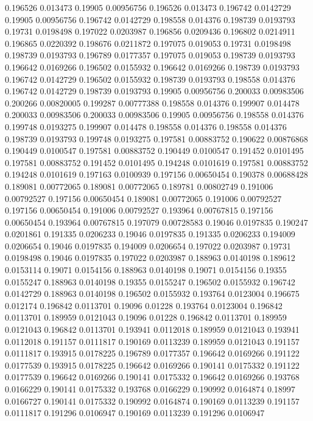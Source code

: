 0.196526 0.013473
0.19905 0.00956756
0.196526 0.013473
0.196742 0.0142729
0.19905 0.00956756
0.196742 0.0142729
0.198558 0.014376
0.198739 0.0193793
0.19731 0.0198498
0.197022 0.0203987
0.196856 0.0209436
0.196802 0.0214911
0.196865 0.0220392
0.198676 0.0211872
0.197075 0.019053
0.19731 0.0198498
0.198739 0.0193793
0.196789 0.0177357
0.197075 0.019053
0.198739 0.0193793
0.196642 0.0169266
0.196502 0.0155932
0.196642 0.0169266
0.198739 0.0193793
0.196742 0.0142729
0.196502 0.0155932
0.198739 0.0193793
0.198558 0.014376
0.196742 0.0142729
0.198739 0.0193793
0.19905 0.00956756
0.200033 0.00983506
0.200266 0.00820005
0.199287 0.00777388
0.198558 0.014376
0.199907 0.014478
0.200033 0.00983506
0.200033 0.00983506
0.19905 0.00956756
0.198558 0.014376
0.199748 0.0193275
0.199907 0.014478
0.198558 0.014376
0.198558 0.014376
0.198739 0.0193793
0.199748 0.0193275
0.197581 0.00883752
0.190622 0.00876868
0.190449 0.0100547
0.197581 0.00883752
0.190449 0.0100547
0.191452 0.0101495
0.197581 0.00883752
0.191452 0.0101495
0.194248 0.0101619
0.197581 0.00883752
0.194248 0.0101619
0.197163 0.0100939
0.197156 0.00650454
0.190378 0.00688428
0.189081 0.00772065
0.189081 0.00772065
0.189781 0.00802749
0.191006 0.00792527
0.197156 0.00650454
0.189081 0.00772065
0.191006 0.00792527
0.197156 0.00650454
0.191006 0.00792527
0.193964 0.00767815
0.197156 0.00650454
0.193964 0.00767815
0.197079 0.00728583
0.19046 0.0197835
0.190247 0.0201861
0.191335 0.0206233
0.19046 0.0197835
0.191335 0.0206233
0.194009 0.0206654
0.19046 0.0197835
0.194009 0.0206654
0.197022 0.0203987
0.19731 0.0198498
0.19046 0.0197835
0.197022 0.0203987
0.188963 0.0140198
0.189612 0.0153114
0.19071 0.0154156
0.188963 0.0140198
0.19071 0.0154156
0.19355 0.0155247
0.188963 0.0140198
0.19355 0.0155247
0.196502 0.0155932
0.196742 0.0142729
0.188963 0.0140198
0.196502 0.0155932
0.193764 0.0123004
0.196675 0.012174
0.196842 0.0113701
0.19096 0.01228
0.193764 0.0123004
0.196842 0.0113701
0.189959 0.0121043
0.19096 0.01228
0.196842 0.0113701
0.189959 0.0121043
0.196842 0.0113701
0.193941 0.0112018
0.189959 0.0121043
0.193941 0.0112018
0.191157 0.0111817
0.190169 0.0113239
0.189959 0.0121043
0.191157 0.0111817
0.193915 0.0178225
0.196789 0.0177357
0.196642 0.0169266
0.191122 0.0177539
0.193915 0.0178225
0.196642 0.0169266
0.190141 0.0175332
0.191122 0.0177539
0.196642 0.0169266
0.190141 0.0175332
0.196642 0.0169266
0.193768 0.0166229
0.190141 0.0175332
0.193768 0.0166229
0.190992 0.0164874
0.18997 0.0166727
0.190141 0.0175332
0.190992 0.0164874
0.190169 0.0113239
0.191157 0.0111817
0.191296 0.0106947
0.190169 0.0113239
0.191296 0.0106947
